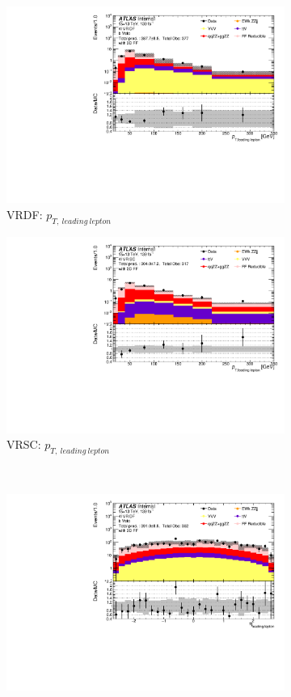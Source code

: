 \begin{figure}[htb]
\begin{subfigure}{.48\textwidth}
        \centering
        \includegraphics[width = 0.85\linewidth]{figures/Analysis/Background/Overlay_VRDF_FFApplied_pt1.pdf}
        \caption{VRDF: $p_{T,~leading~lepton}$}
    \end{subfigure}
    \begin{subfigure}{.48\textwidth}
        \centering
        \includegraphics[width = 0.85\linewidth]{figures/Analysis/Background/Overlay_VRSC_FFApplied_pt1.pdf}
        \caption{VRSC: $p_{T,~leading~lepton}$}
    \end{subfigure} \\
    \begin{subfigure}{.48\textwidth}
        \centering
        \includegraphics[width = 0.85\linewidth]{figures/Analysis/Background/Overlay_VRDF_FFApplied_eta1.pdf}

\end{subfigure}
\end{figure}
